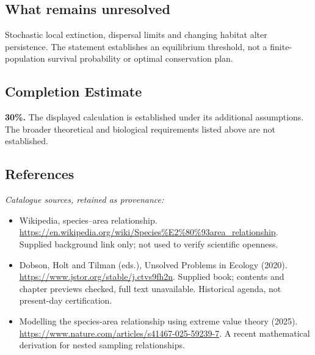 \documentclass[11pt]{article}
\begin{document}
\subsection{What remains unresolved}
Stochastic local extinction, dispersal limits and changing habitat alter persistence. The statement establishes an equilibrium threshold, not a finite-population survival probability or optimal conservation plan.
\subsection{Completion Estimate}
\textbf{30\%.} The displayed calculation is established under its additional assumptions. The broader theoretical and biological requirements listed above are not established.
\subsection{References}
\noindent\emph{Catalogue sources, retained as provenance:}
\begin{itemize}
\item Wikipedia, species--area relationship. \url{https://en.wikipedia.org/wiki/Species%E2%80%93area_relationship}. Supplied background link only; not used to verify scientific openness.
\item Dobson, Holt and Tilman (eds.), Unsolved Problems in Ecology (2020). \url{https://www.jstor.org/stable/j.ctvs9fh2n}. Supplied book; contents and chapter previews checked, full text unavailable. Historical agenda, not present-day certification.
\item Modelling the species-area relationship using extreme value theory (2025). \url{https://www.nature.com/articles/s41467-025-59239-7}. A recent mathematical derivation for nested sampling relationships.
\end{itemize}
\end{document}
